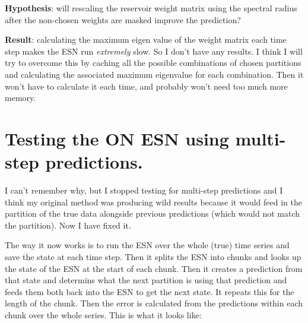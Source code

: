 \documentclass[a4paper,12pt]{article}
\begin{document}
\textbf{Hypothesis}: will rescaling the reservoir weight matrix using the spectral radius after the non-chosen weights are masked improve the prediction?

\textbf{Result}: calculating the maximum eigen value of the weight matrix each time step makes the ESN run \textit{extremely} slow. So I don't have any results. I think I will try to overcome this by caching all the possible combinations of chosen partitions and calculating the associated maximum eigenvalue for each combination. Then it won't have to calculate it each time, and probably won't need too much more memory.



\section{Testing the ON ESN using multi-step predictions.}

I can't remember why, but I stopped testing for multi-step predictions and I think my original method was producing wild results because it would feed in the partition of the true data alongside previous predictions (which would not match the partition). Now I have fixed it.

The way it now works is to run the ESN over the whole (true) time series and save the state at each time step. Then it splits the ESN into chunks and looks up the state of the ESN at the start of each chunk. Then it creates a prediction from that state and determins what the next partition is using that prediction and feeds them both back into the ESN to get the next state. It repeats this for the length of the chunk. Then the error is calculated from the predictions within each chunk over the whole series. This is what it looks like:
\end{document}
